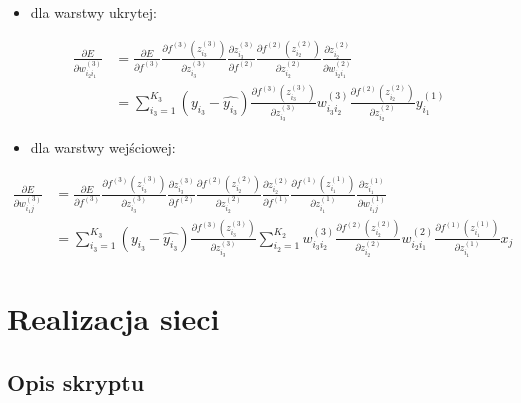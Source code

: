 \documentclass[12pt,twoside]{article}
\begin{document}
\begin{itemize}[resume]
	\item dla warstwy ukrytej:
\end{itemize}
\begin{equation}
	\begin{aligned}
		\frac{\partial E}{\partial w_{i_2i_1}^{(3)}}&= \frac{\partial E}{\partial f^{(3)}}\frac{\partial f^{(3)}(z_{i_3}^{(3)})}{\partial z_{i_3}^{(3)}}\frac{\partial z_{i_3}^{(3)}}{\partial f^{(2)}} \frac{\partial f^{(2)}(z_{i_2}^{(2)})}{\partial z_{i_2}^{(2)}}\frac{\partial z_{i_2}^{(2)}}{\partial w_{i_2i_1}^{(2)}}\\
		&= \sum_{i_3=1}^{K_3} (y_{i_3} - \hat{y_{i_3}}) \frac{\partial f^{(3)}(z_{i_3}^{(3)})}{\partial z_{i_3}^{(3)}} w_{i_3i_2}^{(3)}
		\frac{\partial f^{(2)}(z_{i_2}^{(2)})}{\partial z_{i_2}^{(2)}} y_{i_1}^{(1)}
	\end{aligned}
\end{equation}

\begin{itemize}[resume]
	\item dla warstwy wejściowej:
\end{itemize}
\begin{equation}
	\begin{aligned}
		\frac{\partial E}{\partial w_{i_1j}^{(3)}}&= \frac{\partial E}{\partial f^{(3)}}\frac{\partial f^{(3)}(z_{i_3}^{(3)})}{\partial z_{i_3}^{(3)}}\frac{\partial z_{i_3}^{(3)}}{\partial f^{(2)}} \frac{\partial f^{(2)}(z_{i_2}^{(2)})}{\partial z_{i_2}^{(2)}}\frac{\partial z_{i_2}^{(2)}}{\partial f^{(1)}}
		\frac{\partial f^{(1)}(z_{i_1}^{(1)})}{\partial z_{i_1}^{(1)}}\frac{\partial z_{i_1}^{(1)}}{\partial w_{i_1j}^{(1)}}\\
		&= \sum_{i_3=1}^{K_3} (y_{i_3} - \hat{y_{i_3}}) \frac{\partial f^{(3)}(z_{i_3}^{(3)})}{\partial z_{i_3}^{(3)}} \sum_{i_2=1}^{K_2} w_{i_3i_2}^{(3)}
		\frac{\partial f^{(2)}(z_{i_2}^{(2)})}{\partial z_{i_2}^{(2)}} w_{i_2i_1}^{(2)} \frac{\partial f^{(1)}(z_{i_1}^{(1)})}{\partial z_{i_1}^{(1)}} x_j
	\end{aligned}
\end{equation}
\newpage

\clearpage

\section{Realizacja sieci}

\subsection{Opis skryptu}
\end{document}
